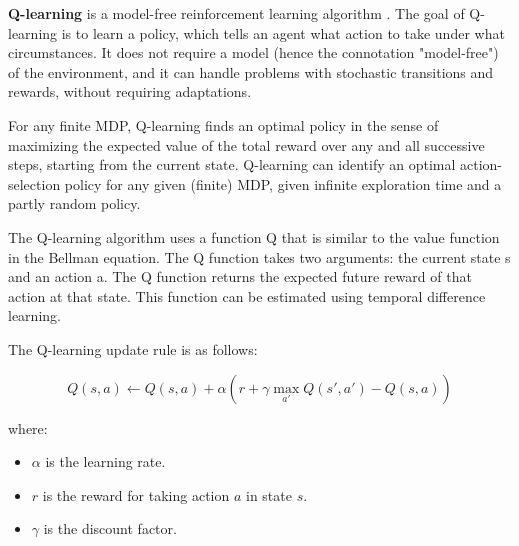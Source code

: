 \documentclass[10pt,letterpaper]{article}
\begin{document}
\textbf{Q-learning} is a model-free reinforcement learning algorithm \cite{watkins1992q}. The goal of Q-learning is to learn a policy, which tells an agent what action to take under what circumstances. It does not require a model (hence the connotation "model-free") of the environment, and it can handle problems with stochastic transitions and rewards, without requiring adaptations.

For any finite MDP, Q-learning finds an optimal policy in the sense of maximizing the expected value of the total reward over any and all successive steps, starting from the current state. Q-learning can identify an optimal action-selection policy for any given (finite) MDP, given infinite exploration time and a partly random policy.

The Q-learning algorithm uses a function Q that is similar to the value function in the Bellman equation. The Q function takes two arguments: the current state s and an action a. The Q function returns the expected future reward of that action at that state. This function can be estimated using temporal difference learning.

The Q-learning update rule is as follows:

\[ Q(s, a) \leftarrow Q(s, a) + \alpha \left( r + \gamma \max_{a'} Q(s', a') - Q(s, a) \right) \]

where:
\begin{itemize}
\item $\alpha$ is the learning rate.
\item $r$ is the reward for taking action $a$ in state $s$.
\item $\gamma$ is the discount factor.
\end{itemize}
\end{document}
